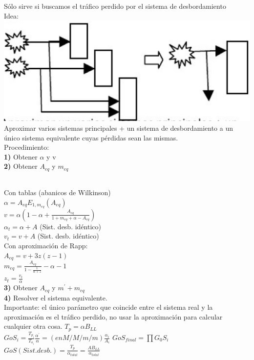 \begin{minipage}{.22\textwidth}
	Sólo sirve si buscamos el tráfico perdido por el sistema de desbordamiento \\
	Idea: \\
	\includegraphics[scale=0.18]{modelotraficoequivalente.png} \\
	Aproximar varios sistemas principales + un sistema de desbordamiento a un único sistema equivalente cuyas pérdidas sean las mismas.\\
	Procedimiento: \\
	{\bf 1)} Obtener $\alpha$ y v\\
	{\bf 2)} Obtener $A_{eq}$ y $m_{eq}$\\ \\
\end{minipage}
\vfill\null
\columnbreak
\begin{minipage}{.22\textwidth}
	Con tablas (abanicos de Wilkinson) \\
	$\alpha=A_{eq}E_{1,m_{eq}}(A_{eq})$ \\
	$v=\alpha(1-\alpha+\frac{A_{eq}}{1+m_{eq}+\alpha-A_{eq}})$\\
	$\alpha_t=\alpha+A$ (Sist. desb. idéntico)\\
	$v_t=v+A$ (Sist. desb. idéntico)\\
	Con aproximación de Rapp: \\
	$A_{eq}=v+3z(z-1)$\\
	$m_{eq}=\frac{A_{eq}}{1-\frac{1}{\alpha+z}}-\alpha-1$ \\
	$z_t=\frac{v_t}{\alpha}$ \\
	{\bf 3)} Obtener $A_{eq}$ y $m^{'}+m_{eq}$ \\
	{\bf 4)} Resolver el sistema equivalente. \\
	Importante: el único parámetro que coincide entre el sistema real y la aproximación es el tráfico perdido, no usar la aproximación para calcular cualquier otra cosa. $T_p=\alpha{B_{LL}}$ \\
	$Go{S_i}=\frac{T_{p_i}}{T_{o_i}}\frac{\alpha^{'}}{\alpha}=(en M/M/m/m)\frac{\alpha_i}{A_i}$
	$GoS_{final}=\prod{G_0{S_i}}$ \\
	$GoS (Sist. desb.) = \frac{T_p}{\alpha_{total}} = \frac{AB_{LL}}{\alpha_{total}}$\\
\end{minipage}

